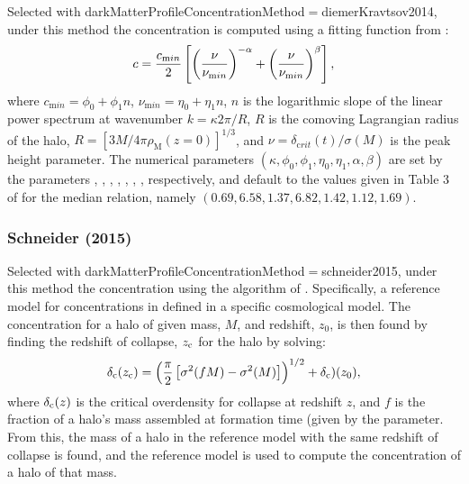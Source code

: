 Selected with {\normalfont \ttfamily darkMatterProfileConcentrationMethod}$=${\normalfont \ttfamily diemerKravtsov2014}, under this method the concentration is computed using a fitting function from \cite{diemer_universal_2014}:
\begin{equation}
c = {c_{\mathrm min} \over 2} \left[ \left({\nu\over\nu_{\mathrm min}}\right)^{-\alpha} + \left({\nu\over\nu_{\mathrm min}}\right)^{\beta} \right],
\end{equation}
where $c_{\mathrm min}=\phi_0+\phi_1 n$, $\nu_{\mathrm min}=\eta_0+\eta_1 n$, $n$ is the logarithmic slope of the linear power spectrum at wavenumber $k = \kappa 2 \pi / R$, $R$ is the comoving Lagrangian radius of the halo, $R=[3 M / 4 \pi \rho_{\mathrm M}(z=0)]^{1/3}$, and $\nu=\delta_{\mathrm crit}(t)/\sigma(M)$ is the peak height parameter. The numerical parameters $(\kappa,\phi_0,\phi_1,\eta_0,\eta_1,\alpha,\beta)$ are set by the parameters {\normalfont {}},  {\normalfont {}},  {\normalfont {}},  {\normalfont {}},  {\normalfont {}},  {\normalfont {}},  {\normalfont {}}, respectively, and default to the values given in Table 3 of \cite{diemer_universal_2014} for the median relation, namely $(0.69,6.58,1.37,6.82,1.42,1.12,1.69)$.

\subsubsection{Schneider (2015)}\label{phys:darkMatterProfileConcentration:darkMatterProfileConcentrationSchneider2015}

Selected with {\normalfont \ttfamily darkMatterProfileConcentrationMethod}$=${\normalfont \ttfamily schneider2015}, under this method the concentration using the algorithm of \cite{schneider_structure_2015}. Specifically, a reference model for concentrations in defined in a specific cosmological model. The concentration for a halo of given mass, $M$, and redshift, $z_0$, is then found by finding the redshift of collapse, $z_{\rm c}$ for the halo by solving:
\begin{equation}
  \delta_{\rm c}(z_{\rm c}) = \left( {\pi \over 2} \left[ \sigma^2(f M) - \sigma^2(M)  \right]  \right)^{1/2}+\delta_{\rm c})(z_0),
\end{equation}
where $\delta_{\rm c}(z)$ is the critical overdensity for collapse at redshift $z$, and $f$ is the fraction of a halo's mass assembled at formation time (given by the {\normalfont \ttfamily [massFractionFormation]} parameter. From this, the mass of a halo in the reference model with the same redshift of collapse is found, and the reference model is used to compute the concentration of a halo of that mass. 

